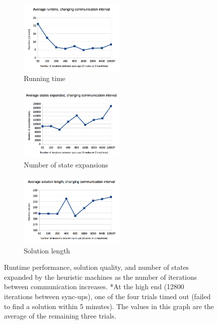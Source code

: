 \documentclass[11pt]{article}
\begin{document}
\begin{figure}
\centering
\begin{subfigure}{2.0in}
  \includegraphics[width=2.0in]{graphs/commfreq_runningtime}
  \caption{Running time}
  \label{fig:commfreq_runtime}
\end{subfigure}
\begin{subfigure}{2.0in}
  \includegraphics[width=2.0in]{graphs/commfreq_expansions}
  \caption{Number of state expansions}
  \label{fig:commfreq_expansions}
\end{subfigure}
\begin{subfigure}{2.0in}
  \includegraphics[width=2.0in]{graphs/commfreq_solutionquality}
  \caption{Solution length}
  \label{fig:nummachines_solnqual}
\end{subfigure}
\caption{Runtime performance, solution quality, and number of states expanded by the heuristic machines as the number of iterations between communication increases. *At the high end (12800 iterations between sync-ups), one of the four trials timed out (failed to find a solution within 5 minutes). The values in this graph are the average of the remaining three trials.}
\label{fig:commfreq}
\end{figure}
\end{document}

